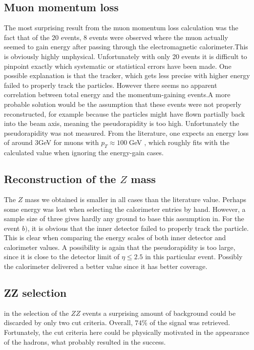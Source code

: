 \documentclass[twoside,        %
               BCOR12mm,       %
               ngerman,english, %
               fleqn,headsepline=false,footsepline=false
              ]{Vorlage/MFPREPORT}
\begin{document}
\subsection{Muon momentum loss}
The most surprising result from the muon momentum loss calculation was the fact
that of the 20 events, 8 events were observed where the muon actually seemed to
gain energy after passing through the electromagnetic calorimeter.This is
obviously highly unphysical. Unfortunately with only 20 events it is difficult
to pinpoint exactly which systematic or statistical errors have been made. One
possible explanation is that the tracker, which gets less precise with higher
energy failed to properly track the particles. However there seems no apparent
correlation between total energy and the momentum-gaining events.A more
probable solution would be the assumption that these events were not properly
reconstructed, for example because the particles might have flown partially
back into the beam axis, meaning the pseudorapidity is too high. Unfortunately
the pseudorapidity was not measured. From the literature, one expects an energy
loss of around 3\;GeV for muons with $p_T\approx100\;$GeV \cite{loss}, which
roughly fits with the calculated value when ignoring the energy-gain cases.

\subsection{Reconstruction of the $Z$ mass}
The $Z$ mass we obtained is smaller in all cases than the literature value.
Perhaps some energy was lost when selecting the calorimeter entries by hand.
However, a sample size of three gives hardly any ground to base this assumption
in. For the event $b)$, it is obvious that the inner detector failed to
properly track the particle. This is clear when comparing the energy scales of
both inner detector and calorimeter values. A possibility is again that the
pseudorapidity is too large, since it is close to the detector limit of
$\eta\leq2.5$ in this particular event. Possibly the calorimeter delivered a
better value since it has better coverage.

\subsection{ZZ selection}
in the selection of the $ZZ$ events a surprising amount of background could be
discarded by only two cut criteria. Overall, $74\%$ of the signal was
retrieved. Fortunately, the cut criteria here could be physically motivated in
the appearance of the hadrons, what probably resulted in the success.
\end{document}
